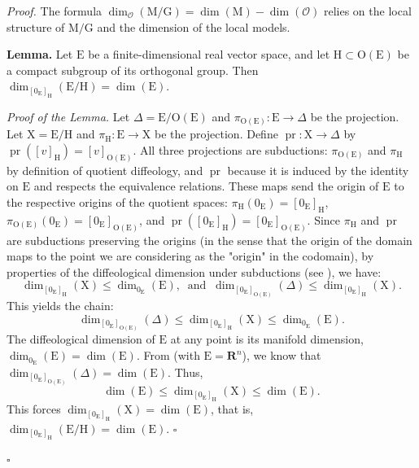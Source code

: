 \documentclass[10pt,reqno,letterpaper,twoside]{amsart}
\theoremstyle{article}
\renewenvironment{proof}%
{\noindent\textit{Proof.}}%
{\nolinebreak\hfill $\square$}
\newcommand{\RR}{\mathbf{R}}
\newcommand{\cO}{{\mathcal O}}
\def \E{\mathrm E}
\def \G{\mathrm G}
\def \H{\mathrm H}
\def \M{\mathrm M}
\def \O{\mathrm O}
\def \X{\mathrm X}
\DeclareMathOperator{\pr}{pr}
\newcommand{\proofend}{\hfill $\square$}
\def \H{\mathrm H} %
\def \O{\mathrm O}
\begin{document}
  \begin{proof}
    The formula $\dim_{\cO}(\M/\G) = \dim(\M) - \dim(\cO)$ relies on the local structure of $\M/\G$ and the dimension of the local models.
    
    \textbf{Lemma.} Let $\E$ be a finite-dimensional real vector space,
    and let $\H \subset \O(\E)$ be a compact subgroup of its orthogonal group.
    Then $\dim_{[0_\E]_\H}(\E/\H) = \dim(\E)$.
    
    \textit{Proof of the Lemma.}
    Let $\Delta = \E/\O(\E)$ and $\pi_{\O(\E)} : \E \to \Delta$ be the projection.
    Let $\X = \E/\H$ and $\pi_\H : \E \to \X$ be the projection.
    Define $\pr : \X \to \Delta$ by $\pr([v]_\H) = [v]_{\O(\E)}$.
    All three projections are subductions: $\pi_{\O(\E)}$ and $\pi_\H$ by definition of quotient diffeology,
    and $\pr$ because it is induced by the identity on $\E$ and respects the equivalence relations.
    These maps send the origin of $\E$ to the respective origins of the quotient spaces: $\pi_\H(0_\E) = [0_\E]_\H$, $\pi_{\O(\E)}(0_\E) = [0_\E]_{\O(\E)}$,
    and $\pr([0_\E]_\H) = [0_\E]_{\O(\E)}$.
    Since $\pi_\H$ and $\pr$ are subductions preserving the origins
    (in the sense that the origin of the domain maps to the point we are considering as the "origin" in the codomain),
    by properties of the diffeological dimension under subductions
    (see \cite[, 2.26]{PIZ13}),
    we have:
    $$
      \dim_{[0_\E]_\H}(\X) \leq \dim_{0_\E}(\E),
      \ \text{ and } \
      \dim_{[0_\E]_{\O(\E)}}(\Delta) \leq \dim_{[0_\E]_\H}(\X).
      $$
    This yields the chain:
    $$
      \dim_{[0_\E]_{\O(\E)}}(\Delta) \leq \dim_{[0_\E]_\H}(\X) \leq  \dim_{0_\E}(\E).
      $$
    The diffeological dimension of $\E$ at any point is its manifold dimension,
    $\dim_{0_\E}(\E) = \dim(\E)$.
    From \cite[Exercise 50]{PIZ13}
    (with $\E = \RR^n$),
    we know that $\dim_{[0_\E]_{\O(\E)}}(\Delta) = \dim(\E)$.
    Thus,
    \begin{equation*}
      \dim(\E) \leq \dim_{[0_\E]_\H}(\X) \leq  \dim(\E).
    \end{equation*}
    This forces $\dim_{[0_\E]_\H}(\X) = \dim(\E)$, that is, $\dim_{[0_\E]_\H}(\E/\H) = \dim(\E)$.
    \proofend
    

\end{proof}
\end{document}
